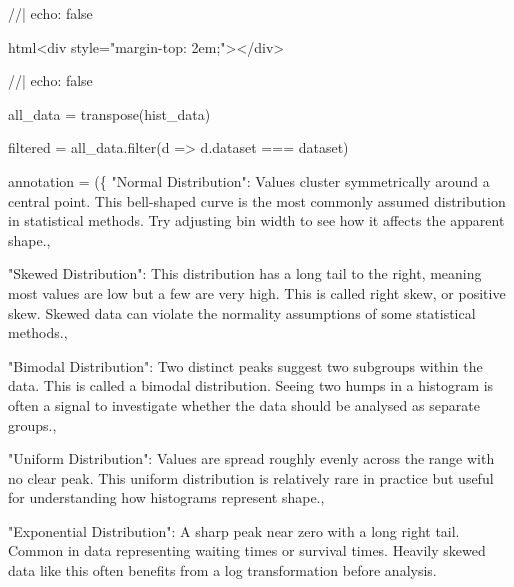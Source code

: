 \documentclass[
  letterpaper,
  DIV=11,
  numbers=noendperiod]{scrartcl}
\newenvironment{Shaded}{\begin{snugshade}}{\end{snugshade}}
\newcommand{\NormalTok}[1]{\textcolor[rgb]{0.00,0.23,0.31}{#1}}
\begin{document}
\begin{Shaded}
\begin{Highlighting}[]
\NormalTok{//| echo: false}

\NormalTok{html\textasciigrave{}\textless{}div style="margin{-}top: 2em;"\textgreater{}\textless{}/div\textgreater{}\textasciigrave{}}
\end{Highlighting}
\end{Shaded}

\begin{Shaded}
\begin{Highlighting}[]
\NormalTok{//| echo: false}

\NormalTok{all\_data = transpose(hist\_data)}

\NormalTok{filtered = all\_data.filter(d =\textgreater{} d.dataset === dataset)}

\NormalTok{annotation = (\{}
\NormalTok{  "Normal Distribution": \textasciigrave{}Values cluster symmetrically around a central point. }
\NormalTok{    This bell{-}shaped curve is the most commonly assumed distribution in statistical }
\NormalTok{    methods. Try adjusting bin width to see how it affects the apparent shape.\textasciigrave{},}

\NormalTok{  "Skewed Distribution": \textasciigrave{}This distribution has a long tail to the right, meaning most }
\NormalTok{    values are low but a few are very high. This is called right skew, or positive skew. }
\NormalTok{    Skewed data can violate the normality assumptions of some statistical methods.\textasciigrave{},}

\NormalTok{  "Bimodal Distribution": \textasciigrave{}Two distinct peaks suggest two subgroups within the data. }
\NormalTok{    This is called a bimodal distribution. Seeing two humps in a histogram is often }
\NormalTok{    a signal to investigate whether the data should be analysed as separate groups.\textasciigrave{},}

\NormalTok{  "Uniform Distribution": \textasciigrave{}Values are spread roughly evenly across the range with no }
\NormalTok{    clear peak. This uniform distribution is relatively rare in practice but useful }
\NormalTok{    for understanding how histograms represent shape.\textasciigrave{},}

\NormalTok{  "Exponential Distribution": \textasciigrave{}A sharp peak near zero with a long right tail. Common }
\NormalTok{    in data representing waiting times or survival times. Heavily skewed data like }
\NormalTok{    this often benefits from a log transformation before analysis.\textasciigrave{}}


\end{Highlighting}
\end{Shaded}
\end{document}
